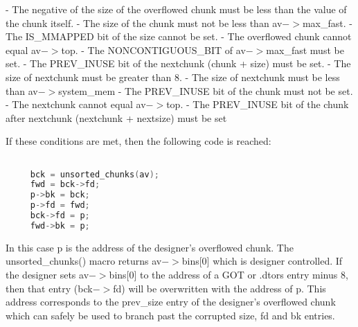 \documentclass[12pt]{article}
\begin{document}
     - The negative of the size of the overflowed chunk must
       be less than the value of the chunk itself.\newline\newline
     - The size of the chunk must not be less than av$->$max\_fast.\newline\newline
     - The IS\_MMAPPED bit of the size cannot be set.\newline\newline
     - The overflowed chunk cannot equal av$->$top.\newline\newline
     - The NONCONTIGUOUS\_BIT of av$->$max\_fast must be set.\newline\newline
     - The PREV\_INUSE bit of the nextchunk (chunk + size)
       must be set.\newline\newline
     - The size of nextchunk must be greater than 8.\newline\newline
     - The size of nextchunk must be less than av$->$system\_mem\newline\newline
     - The PREV\_INUSE bit of the chunk must not be set.\newline\newline
     - The nextchunk cannot equal av$->$top.\newline\newline
     - The PREV\_INUSE bit of the chunk after nextchunk
       (nextchunk + nextsize) must be set\newline\newline

If these conditions are met, then the following code is reached:
\begin{lstlisting}[language=C]

     bck = unsorted_chunks(av);
     fwd = bck->fd;
     p->bk = bck;
     p->fd = fwd;
     bck->fd = p;
     fwd->bk = p;
\end{lstlisting}
In this case p is the address of the designer's overflowed chunk.
The unsorted\_chunks() macro returns av$->$bins[0] which is designer
controlled. If the designer sets av$->$bins[0] to the address of a
GOT or .dtors entry minus 8, then that entry (bck$->$fd) will be
overwritten with the address of p. This address corresponds to the
prev\_size entry of the designer's overflowed chunk which can safely
be used to branch past the corrupted size, fd and bk entries.
\newline
\end{document}
